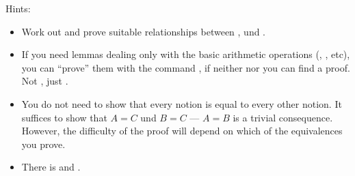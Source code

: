 \begin{isabellebody}
\begin{isamarkuptext}
Hints:
\begin{itemize}
\item Work out and prove suitable relationships between ,
       und .

\item If you need lemmas dealing only with the basic arithmetic operations
(\isa{{\isacharplus}}, \isa{{\isacharasterisk}}, \isa{{\isacharcircum}} etc), you can ``prove'' them
with the command , if neither  nor you can
find a proof. Not , just .

\item
You do not need to show that every notion is equal to every other
notion.  It suffices to show that $A = C$ und $B = C$ --- $A = B$ is a
trivial consequence. However, the difficulty of the proof will depend
on which of the equivalences you prove.

\item There is \isa{{\isasymand}} and \isa{{\isasymlongrightarrow}}.
\end{itemize}%
\end{isamarkuptext}%
\isamarkuptrue%
\isamarkupfalse%
\end{isabellebody}%
